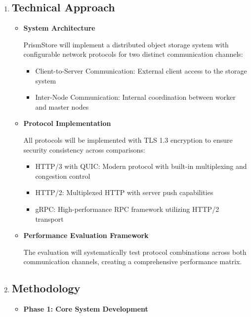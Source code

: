 \documentclass[12pt]{article}
\begin{document}
\begin{enumerate}
    \item \subsection*{Technical Approach}

        \begin{itemize}
            \item \textbf{System Architecture}
        
                PrismStore will implement a distributed object storage system with configurable network protocols for two distinct communication channels:
                \begin{itemize}
                    \item Client-to-Server Communication: External client access to the storage system
                    \item Inter-Node Communication: Internal coordination between worker and master nodes
                \end{itemize}

            \item \textbf{Protocol Implementation}
        
                All protocols will be implemented with TLS 1.3 encryption to ensure security consistency across comparisons:
                    \begin{itemize}
                        \item HTTP/3 with QUIC: Modern protocol with built-in multiplexing and congestion control
                        \item HTTP/2: Multiplexed HTTP with server push capabilities
                        \item gRPC: High-performance RPC framework utilizing HTTP/2 transport
                    \end{itemize}
                    
            \item \textbf{Performance Evaluation Framework}
        
                The evaluation will systematically test protocol combinations across both communication channels, creating a comprehensive performance matrix.
        \end{itemize}

    \item \subsection*{Methodology}
    \begin{itemize}
        \item \textbf{ Phase 1: Core System Development}
        

\end{itemize}
\end{enumerate}
\end{document}
